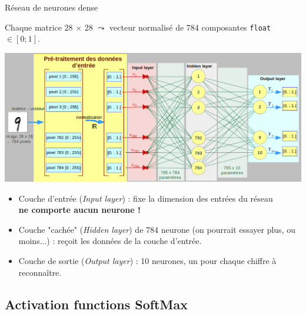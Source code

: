 \documentclass[10pt,serif,mathserif,compress,hyperref={colorlinks}]{beamer}
\begin{document}
\begin{frame}{Réseau de neurones dense}

  {\footnotesize Chaque matrice 28$\,\times\,$28 $\leadsto$ vecteur normalisé de 784 composantes \texttt{float} $\in [0;1]$.}

  \hspace*{-5mm}\includegraphics[width=.9\textwidth]{images/archiReseau-2.png}
  
  {\footnotesize
  \begin{itemize}
  \item Couche d'entrée ({\em Input layer}) : fixe la dimension des entrées du réseau\\
    {\bf ne comporte aucun neurone !}
  \item Couche "cachée" ({\em Hidden layer}) de 784 neurone (on pourrait essayer plus, ou moins...) :
    reçoit les données de la couche d'entrée.
  \item Couche de sortie ({\em Output layer}) : 10 neurones, un pour chaque chiffre à reconnaître.
  \end{itemize}
  }

  
\end{frame}

\subsection{Activation functions SoftMax}
\end{document}
